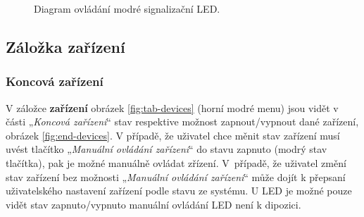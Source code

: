 \begin{Czech}
\begin{figure}[H]
    \centering
    \def\svgwidth{1\columnwidth}
    \graphicspath{{pictures/czech/software/svg/}}
    
    \caption{Diagram ovládání modré signalizační LED.}
    \label{fig:diagram-blue-led-indication}
\end{figure}
\end{Czech}

\begin{Czech}
\end{Czech}


\begin{Czech}
\subsection{Záložka zařízení}
\end{Czech}

\begin{Czech}
\subsubsection{Koncová zařízení}
\end{Czech}

\begin{Czech}
V záložce \textbf{zařízení} obrázek \ref{fig:tab-devices} (horní modré menu) jsou vidět v části „\textit{Koncová zařízení}“ stav respektive možnost zapnout/vypnout dané zařízení, obrázek \ref{fig:end-devices}. V případě, že uživatel chce měnit stav zařízení musí uvést tlačítko „\textit{Manuální ovládání zařízení}“ do stavu zapnuto (modrý stav tlačítka), pak je možné manuálně ovládat zřízení. \mbox{V případě}, že uživatel změní stav zařízení bez možnosti „\textit{Manuální ovládání zařízení}“ může dojít k přepsaní uživatelského nastavení zařízení podle stavu ze systému. U LED je možné pouze vidět stav zapnuto/vypnuto manuální ovládání LED není k dipozici.
\end{Czech}

